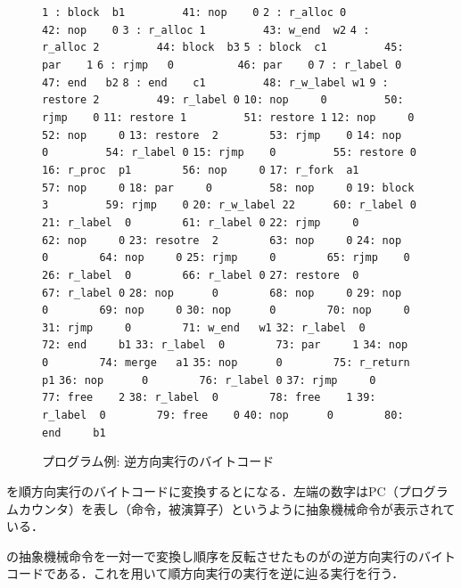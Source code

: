 \documentclass[submit,PRO]{ipsj}
\def\|{\verb|}
\begin{document}
\begin{figure}[tb]
\vbox{
\hbox{\|1 : block  b1         41: nop    0|}
\hbox{\|2 : r_alloc 0         42: nop    0|}
\hbox{\|3 : r_alloc 1         43: w_end  w2|}
\hbox{\|4 : r_alloc 2         44: block  b3|}
\hbox{\|5 : block  c1         45: par    1|}
\hbox{\|6 : rjmp   0          46: par    0|}
\hbox{\|7 : r_label 0         47: end   b2|}
\hbox{\|8 : end    c1         48: r_w_label w1|}
\hbox{\|9 : restore 2         49: r_label 0|}
\hbox{\|10: nop     0         50: rjmp    0|}
\hbox{\|11: restore 1         51: restore 1|}
\hbox{\|12: nop     0         52: nop     0|}
\hbox{\|13: restore  2        53: rjmp    0|}
\hbox{\|14: nop     0         54: r_label 0|}
\hbox{\|15: rjmp    0         55: restore 0|}
\hbox{\|16: r_proc  p1        56: nop     0|}
\hbox{\|17: r_fork  a1        57: nop     0|}
\hbox{\|18: par     0         58: nop     0|}
\hbox{\|19: block   3         59: rjmp    0|}
\hbox{\|20: r_w_label 22      60: r_label 0|}
\hbox{\|21: r_label  0        61: r_label 0|}
\hbox{\|22: rjmp     0        62: nop     0|}
\hbox{\|23: resotre  2        63: nop     0|}
\hbox{\|24: nop      0        64: nop     0|}
\hbox{\|25: rjmp     0        65: rjmp    0|}
\hbox{\|26: r_label  0        66: r_label 0|}
\hbox{\|27: restore  0        67: r_label 0|}
\hbox{\|28: nop      0        68: nop     0|}
\hbox{\|29: nop      0        69: nop     0|}
\hbox{\|30: nop      0        70: nop     0|}
\hbox{\|31: rjmp     0        71: w_end   w1|}
\hbox{\|32: r_label  0        72: end     b1|}
\hbox{\|33: r_label  0        73: par     1|}
\hbox{\|34: nop      0        74: merge   a1|} 
\hbox{\|35: nop      0        75: r_return p1|}
\hbox{\|36: nop      0        76: r_label 0|}
\hbox{\|37: rjmp     0        77: free    2|}
\hbox{\|38: r_label  0        78: free    1|}
\hbox{\|39: r_label  0        79: free    0|}
\hbox{\|40: nop      0        80: end     b1|}
}
\centerline{}
\caption{プログラム例: 逆方向実行のバイトコード}
\label{fig:backward}
\end{figure}



を順方向実行のバイトコードに変換するとになる．左端の数字はPC（プログラムカウンタ）を表し（命令，被演算子）というように抽象機械命令が表示されている．

の抽象機械命令を一対一で変換し順序を反転させたものがの逆方向実行のバイトコードである．これを用いて順方向実行の実行を逆に辿る実行を行う．
\end{document}
